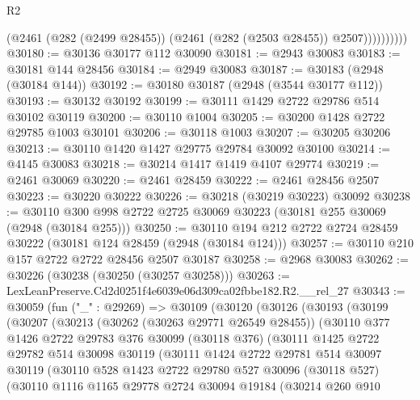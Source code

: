 \begin{lexlean}{R2}
\begin{coremodule}
                    (@2461 (@282 (@2499 @28455)) (@2461 (@282 (@2503 @28455)) @2507))))))))))
@30180 := @30136 @30177 @112 @30090
@30181 := @2943 @30083
@30183 := @30181 @144 @28456
@30184 := @2949 @30083
@30187 := @30183 (@2948 (@30184 @144))
@30192 := @30180 @30187 (@2948 (@3544 @30177 @112))
@30193 := @30132 @30192
@30199 := @30111 @1429 @2722 @29786 @514 @30102 @30119
@30200 := @30110 @1004
@30205 := @30200 @1428 @2722 @29785 @1003 @30101
@30206 := @30118 @1003
@30207 := @30205 @30206
@30213 := @30110 @1420 @1427 @29775 @29784 @30092 @30100
@30214 := @4145 @30083
@30218 := @30214 @1417 @1419 @4107 @29774
@30219 := @2461 @30069
@30220 := @2461 @28459
@30222 := @2461 @28456 @2507
@30223 := @30220 @30222
@30226 := @30218 (@30219 @30223) @30092
@30238 := @30110 @300 @998 @2722 @2725 @30069 @30223 (@30181 @255 @30069 (@2948 (@30184 @255)))
@30250 := @30110 @194 @212 @2722 @2724 @28459 @30222 (@30181 @124 @28459 (@2948 (@30184 @124)))
@30257 := @30110 @210 @157 @2722 @2722 @28456 @2507 @30187
@30258 := @2968 @30083
@30262 := @30226 (@30238 (@30250 (@30257 @30258)))
@30263 := LexLeanPreserve.Cd2d0251f4e6039e06d309ca02fbbe182.R2.__rel_27
@30343 := @30059
    (fun ("_" : @29269) =>
    @30109
      (@30120
        (@30126
          (@30193
            (@30199
              (@30207
                (@30213
                  (@30262 (@30263 @29771 @26549 @28455))
                  (@30110
                    @377
                    @1426
                    @2722
                    @29783
                    @376
                    @30099
                    (@30118 @376)
                    (@30111
                      @1425
                      @2722
                      @29782
                      @514
                      @30098
                      @30119
                      (@30111
                        @1424
                        @2722
                        @29781
                        @514
                        @30097
                        @30119
                        (@30110
                          @528
                          @1423
                          @2722
                          @29780
                          @527
                          @30096
                          (@30118 @527)
                          (@30110
                            @1116
                            @1165
                            @29778
                            @2724
                            @30094
                            @19184
                            (@30214
                              @260
                              @910

\end{coremodule}
\end{lexlean}
